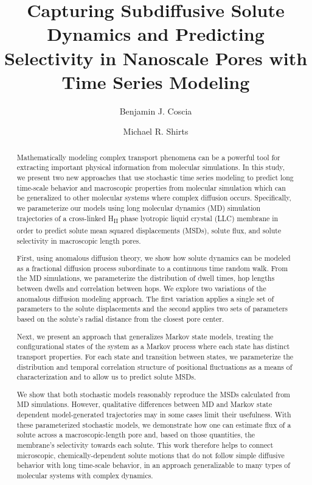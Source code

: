 \documentclass[journal=ancac3,manuscript=article,layout=twocolumn]{achemso}
\title{Capturing Subdiffusive Solute Dynamics and Predicting Selectivity in Nanoscale Pores with Time Series Modeling}
\author{Benjamin J. Coscia}
\affiliation{Department of Chemical and Biological Engineering, University of Colorado Boulder, Boulder, CO 80309, USA}
\author{Michael R. Shirts}
\affiliation{Department of Chemical and Biological Engineering, University of Colorado Boulder, Boulder, CO 80309, USA}
\begin{document}
  
  \begin{abstract}
  
  Mathematically modeling complex transport phenomena can be a powerful tool
  for extracting important physical information from molecular simulations. 
  In this study, we present two new approaches that use stochastic time series
  modeling to predict long time-scale behavior and macroscopic properties 
  from molecular simulation which can be generalized to other molecular systems
  where complex diffusion occurs. Specifically, we parameterize our models using
  long molecular dynamics (MD) simulation trajectories of a cross-linked 
  H\textsubscript{II} phase lyotropic liquid crystal (LLC) membrane in order to
  predict solute mean squared displacements (MSDs), solute flux, and
  solute selectivity in macroscopic length pores.

  First, using anomalous diffusion theory, we show how solute dynamics can be
  modeled as a fractional diffusion process subordinate to a continuous time 
  random walk. From the MD simulations, we parameterize the distribution of 
  dwell times, hop lengths between dwells and correlation between hops. We 
  explore two variations of the anomalous diffusion modeling approach. The first 
  variation applies a single set of parameters to the solute displacements and 
  the second applies two sets of parameters based on the solute's radial distance
  from the closest pore center. 

  Next, we present an approach that generalizes Markov state models, treating 
  the configurational states of the system as a Markov process where each 
  state has distinct transport properties. For each state and transition between
  states, we parameterize the distribution and temporal correlation structure of
  positional fluctuations as a means of characterization and to allow us to
  predict solute MSDs. 
 
  We show that both stochastic models reasonably reproduce the MSDs calculated 
  from MD simulations. However, qualitative differences between MD and Markov 
  state dependent model-generated trajectories may in some cases limit their 
  usefulness. With these parameterized stochastic models, we demonstrate how 
  one can estimate flux of a solute across a macroscopic-length pore and, based
  on those quantities, the membrane's selectivity towards each solute. This
  work therefore helps to connect microscopic, chemically-dependent solute 
  motions that do not follow simple diffusive behavior with long time-scale 
  behavior, in an approach generalizable to many types of molecular systems 
  with complex dynamics.

  \end{abstract}
\end{document}

